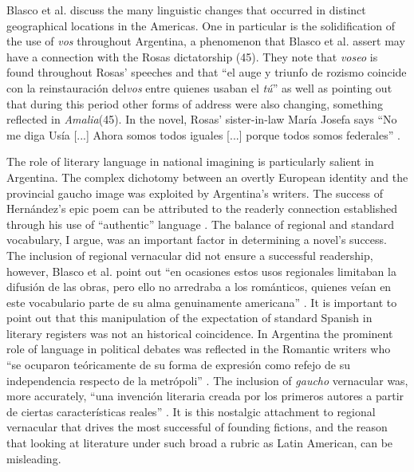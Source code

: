 \documentclass[12pt]{report}
\begin{document}
Blasco et al. discuss the many linguistic changes that occurred in distinct geographical locations in the Americas.
One in particular is the solidification of the use of \textit{vos} throughout Argentina, a phenomenon that Blasco et al. assert may have a connection with the Rosas dictatorship (45).
They note that \textit{voseo} is found throughout Rosas' speeches and that \enquote{el auge y triunfo de rozismo coincide con la reinstauración del\textit{vos} entre quienes usaban el \textit{tú}} as well as pointing out that during this period other forms of address were also changing, something reflected in \textit{Amalia}(45).
In the novel, Rosas' sister-in-law María Josefa says \enquote{No me diga Usía [...] Ahora somos todos iguales [...] porque todos somos federales} \autocite[Mármol in][45]{Blasco1991}.

The role of literary language in national imagining is particularly salient in Argentina.
The complex dichotomy between an overtly European identity and the provincial gaucho image was exploited by Argentina's writers.
The success of Hernández's epic poem can be attributed to the readerly connection established through his use of \enquote{authentic} language \autocite[110]{Sommer1991}.
The balance of regional and standard vocabulary, I argue, was an important factor in determining a novel's success. 
The inclusion of regional vernacular did not ensure a successful readership, however, Blasco et al. point out \enquote{en ocasiones estos usos regionales limitaban la difusión de las obras, pero ello no arredraba a los románticos, quienes veían en este vocabulario parte de su alma genuinamente americana} \autocite[47]{Blasco1991}.
It is important to point out that this manipulation of the expectation of standard Spanish in literary registers was not an historical coincidence.
In Argentina the prominent role of language in political debates was reflected in the Romantic writers who \enquote{se ocuparon teóricamente de su forma de expresión como refejo de su independencia respecto de la metrópoli} \autocite[51]{Blasco1991}.
The inclusion of \textit{gaucho} vernacular was, more accurately, \enquote{una invención literaria creada por los primeros autores a partir de ciertas características reales} \autocite[48]{Blasco1991}.
It is this nostalgic attachment to regional vernacular that drives the most successful of founding fictions, and the reason that looking at literature under such broad a rubric as Latin American, can be misleading.
\end{document}
